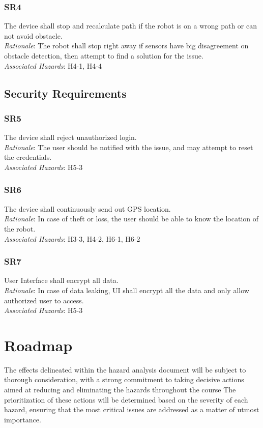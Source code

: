 \documentclass{article}
\begin{document}
\subsubsection{SR4}
The device shall stop and recalculate path if the robot is on a wrong path or can not avoid obstacle.\\
\textit{Rationale}: The robot shall stop right away if sensors have big disagreement on obstacle detection, then attempt to find a solution for the issue.\\
\textit{Associated Hazards}: H4-1, H4-4
\subsection{Security Requirements}
\subsubsection{SR5}
The device shall reject unauthorized login.\\
\textit{Rationale}: The user should be notified with the issue, and may attempt to reset the credentials.\\
\textit{Associated Hazards}: H5-3
\subsubsection{SR6}
The device shall continuously send out GPS location.\\
\textit{Rationale}: In case of theft or loss, the user should be able to know the location of the robot.\\
\textit{Associated Hazards}: H3-3, H4-2, H6-1, H6-2
\subsubsection{SR7}
User Interface shall encrypt all data.\\
\textit{Rationale}: In case of data leaking, UI shall encrypt all the data and only allow authorized user to access.\\
\textit{Associated Hazards}: H5-3

\section{Roadmap}
The effects delineated within the hazard analysis document will be subject to thorough consideration, with a strong commitment to taking decisive actions aimed at reducing and eliminating the hazards throughout the course The prioritization of these actions will be determined based on the severity of each hazard, ensuring that the most critical issues are addressed as a matter of utmost importance.


\clearpage
\appendix
\printnoidxglossaries
\end{document}
